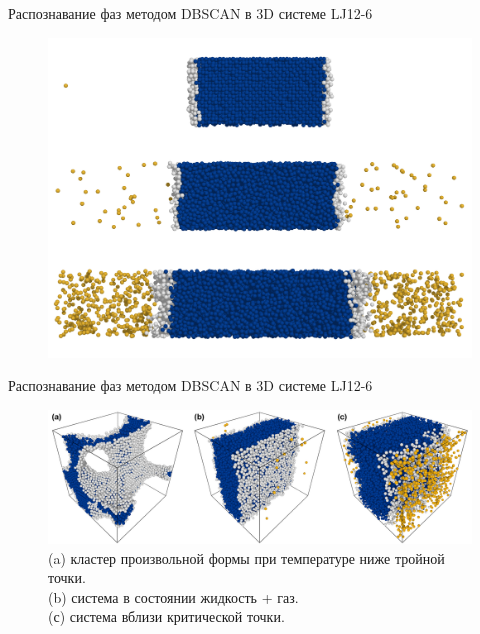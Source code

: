 \documentclass{beamer}
\begin{document}
\begin{frame}{Распознавание фаз методом DBSCAN в 3D системе LJ12-6}
\footnotesize{


\begin{figure}[!t]
    \centering
    \includegraphics[width=0.8\linewidth]{PRIMe-Figure101.png}
    \label{D3_flat_layer}
\end{figure}


}

\end{frame}





\begin{frame}{Распознавание фаз методом DBSCAN в 3D системе LJ12-6}
\footnotesize{
\begin{figure}[!t]
    \centering
    \includegraphics[width=\linewidth]{PRIMe-Figure103.png}
    \caption{(a) кластер произвольной формы при температуре ниже тройной точки. \\
    (b) система в состоянии жидкость + газ. \\
    (с) система вблизи критической точки.}
    \label{D3_free_conf}
\end{figure}
}

\end{frame}
\end{document}
